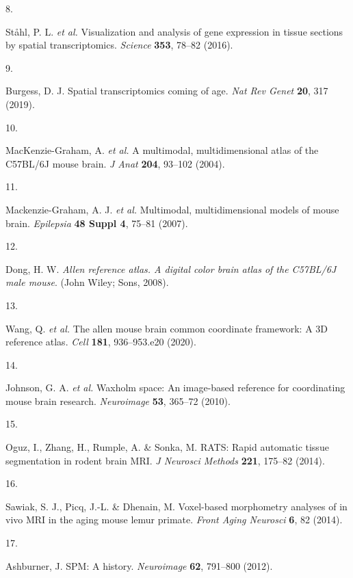 \documentclass[
  12pt,
]{article}
\newlength{\cslhangindent}
\newlength{\csllabelwidth}
\newenvironment{CSLReferences}[2] %
 {%
  \setlength{\parindent}{0pt}
  \ifodd #1 \everypar{\setlength{\hangindent}{\cslhangindent}}\ignorespaces\fi
  \ifnum #2 > 0
  \setlength{\parskip}{#2\baselineskip}
  \fi
 }%
 {}
\newcommand{\CSLLeftMargin}[1]{\parbox[t]{\csllabelwidth}{#1}}
\newcommand{\CSLRightInline}[1]{\parbox[t]{\linewidth - \csllabelwidth}{#1}\break}
\begin{document}
\begin{CSLReferences}{0}{0}
\leavevmode{}%
\CSLLeftMargin{8. }
\CSLRightInline{Ståhl, P. L. \emph{et al.} Visualization and analysis of
gene expression in tissue sections by spatial transcriptomics.
\emph{Science} \textbf{353}, 78--82 (2016).}

\leavevmode{}%
\CSLLeftMargin{9. }
\CSLRightInline{Burgess, D. J. Spatial transcriptomics coming of age.
\emph{Nat Rev Genet} \textbf{20}, 317 (2019).}

\leavevmode{}%
\CSLLeftMargin{10. }
\CSLRightInline{MacKenzie-Graham, A. \emph{et al.} A multimodal,
multidimensional atlas of the C57BL/6J mouse brain. \emph{J Anat}
\textbf{204}, 93--102 (2004).}

\leavevmode{}%
\CSLLeftMargin{11. }
\CSLRightInline{Mackenzie-Graham, A. J. \emph{et al.} Multimodal,
multidimensional models of mouse brain. \emph{Epilepsia} \textbf{48
Suppl 4}, 75--81 (2007).}

\leavevmode{}%
\CSLLeftMargin{12. }
\CSLRightInline{Dong, H. W. \emph{Allen reference atlas. A digital color
brain atlas of the C57BL/6J male mouse}. (John Wiley; Sons, 2008).}

\leavevmode{}%
\CSLLeftMargin{13. }
\CSLRightInline{Wang, Q. \emph{et al.} The allen mouse brain common
coordinate framework: A 3D reference atlas. \emph{Cell} \textbf{181},
936--953.e20 (2020).}

\leavevmode{}%
\CSLLeftMargin{14. }
\CSLRightInline{Johnson, G. A. \emph{et al.} Waxholm space: An
image-based reference for coordinating mouse brain research.
\emph{Neuroimage} \textbf{53}, 365--72 (2010).}

\leavevmode{}%
\CSLLeftMargin{15. }
\CSLRightInline{Oguz, I., Zhang, H., Rumple, A. \& Sonka, M. RATS: Rapid
automatic tissue segmentation in rodent brain MRI. \emph{J Neurosci
Methods} \textbf{221}, 175--82 (2014).}

\leavevmode{}%
\CSLLeftMargin{16. }
\CSLRightInline{Sawiak, S. J., Picq, J.-L. \& Dhenain, M. Voxel-based
morphometry analyses of in vivo MRI in the aging mouse lemur primate.
\emph{Front Aging Neurosci} \textbf{6}, 82 (2014).}

\leavevmode{}%
\CSLLeftMargin{17. }
\CSLRightInline{Ashburner, J. {SPM}: A history. \emph{Neuroimage}
\textbf{62}, 791--800 (2012).}


\end{CSLReferences}
\end{document}

